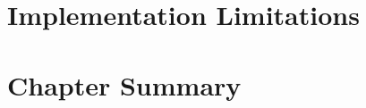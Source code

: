 \section{Implementation Limitations}
\label{sec:implementation-limitations}


\section{Chapter Summary}
\label{sec:implementation-summary}

